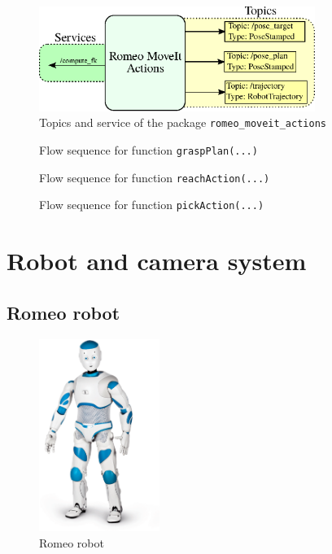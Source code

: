 \documentclass[12pt,a4paper,final,twoside,openright]{report}
\begin{document}
\begin{figure}[!h]
\centering
\includegraphics[width=0.8\textwidth]{images/moveit_actions_ROS.eps}
\caption{Topics and service of the package \texttt{romeo\_moveit\_actions}\label{fig:moveit_actions_ROS}}
\end{figure}

\begin{figure}[!h]
\centering

\caption{Flow sequence for function \texttt{graspPlan(...)}\label{fig:moveit_actions_grasp_plan}}
\end{figure}

\begin{figure}[!h]
\centering

\caption{Flow sequence for function \texttt{reachAction(...)}\label{fig:moveit_actions_reach_action}}
\end{figure}

\begin{figure}[!ħ]
\centering

\caption{Flow sequence for function \texttt{pickAction(...)}\label{fig:moveit_actions_pick_action}}
\end{figure}

\chapter{Robot and camera system}
\label{cha:pre_studies}
\section{Romeo robot}
\begin{figure}
\vspace{-40pt}
	    \centering
		\includegraphics[width=0.35\textwidth]{images/Romeo.eps}
         \caption{Romeo robot \cite{Penton}}
\vspace{-40pt}
\end{figure}
\end{document}
